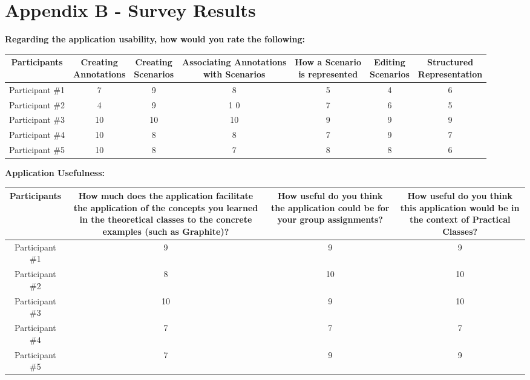 
\chapter{Appendix B - Survey Results}
\label{appendix:appendix_b}

\textbf{Regarding the application usability, how would you rate the following:}
\begin{table}[h]
\centering
\scriptsize
\begin{tabular}{|c|c|c|c|c|c|c|}
    \hline
     \textbf{Participants} & \parbox[c][1cm]{1.5cm}{\textbf{Creating} \\ \textbf{Annotations}} & \parbox[c][1cm]{1.5cm}{\textbf{Creating}\\ \textbf{Scenarios}} & \parbox[c][1cm]{3cm}{\textbf{Associating Annotations} \\ \textbf{with Scenarios}} & \parbox[c][1cm]{2cm}{\textbf{How a Scenario} \\ \textbf{is represented}} & \parbox[c][1cm]{1.5cm}{\textbf{Editing}\\ \textbf{Scenarios}} & \parbox[c][1cm]{2cm}{\textbf{Structured} \\ \textbf{Representation}}\\ \hline
     Participant \#1 & 7 &	9 &	8 & 5 & 4 & 6\\ \hline
	Participant \#2 & 4 & 9 & 1 0 & 7 & 6 & 5\\ \hline
	Participant \#3 & 10 & 10 & 10 & 9 & 9 & 9\\ \hline
	Participant \#4 & 10 & 8 & 8 & 7 & 9 & 7\\ \hline
	Participant \#5 & 10 & 8 & 7 & 8 & 8 & 6\\ \hline
\end{tabular}
\end{table}

\textbf{Application Usefulness:}	
\begin{table}[h]
\centering
\scriptsize
\begin{tabular}{|c|c|c|c|}
    \hline
     \textbf{Participants} & \parbox[c][2cm]{5cm}{\textbf{How much does the application facilitate the application of the concepts you learned in the theoretical classes to the concrete examples (such as Graphite)?}} & \parbox[c][2cm]{3cm}{\textbf{How useful do you think the application could be for your group assignments?}} & \parbox[c][2cm]{3cm}{\textbf{How useful do you think this application would be in the context of Practical Classes?}} \\ \hline
     Participant \#1 & 9 & 9 & 9\\ \hline
Participant \#2 & 8 & 10 & 10\\ \hline
Participant \#3 & 10 & 9 & 10\\ \hline
Participant \#4 & 7 & 7 & 7\\ \hline
Participant \#5 & 7 & 9 & 9\\ \hline
\end{tabular}
\end{table}

